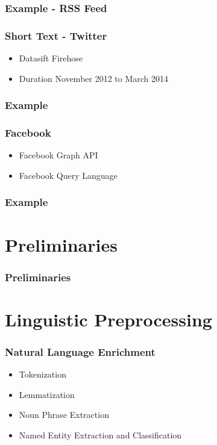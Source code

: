 \documentclass{beamer}
\begin{document}
\begin{frame}
    \frametitle{Example - RSS Feed}
\end{frame}

\begin{frame}
    \frametitle{Short Text - Twitter}
    \begin{itemize}
        \item
            Datasift Firehose
        \item
            Duration November 2012 to March 2014
    \end{itemize}
\end{frame}

\begin{frame}
    \frametitle{Example}
\end{frame}

\begin{frame}
    \frametitle{Facebook}
    \begin{itemize}
        \item
            Facebook Graph API
        \item
            Facebook Query Language
    \end{itemize}
\end{frame}

\begin{frame}
    \frametitle{Example}
\end{frame}

\section{Preliminaries}
\begin{frame}
\frametitle{Preliminaries}
\end{frame}

\section{Linguistic Preprocessing}
\begin{frame}
    \frametitle{Natural Language Enrichment}
    \begin{itemize}
        \item
            Tokenization
        \item
            Lemmatization
        \item
            Noun Phrase Extraction
        \item
            Named Entity Extraction and Classification
    \end{itemize}
\end{frame}
\end{document}
